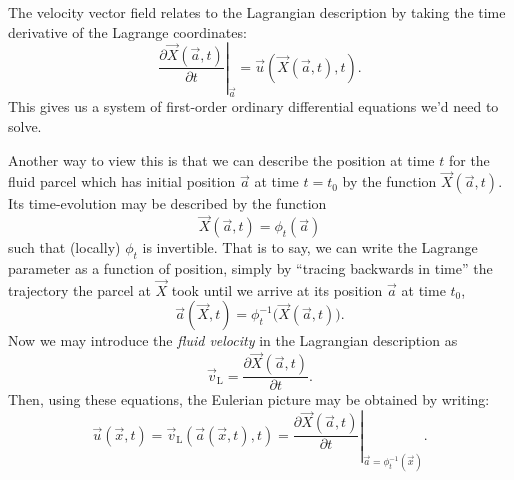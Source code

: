 \begin{node}\label{fluids:describing-0006}%
The velocity vector field relates to the Lagrangian description by
taking the time derivative of the Lagrange coordinates:
\begin{equation}
\left.\frac{\partial\vec{X}(\vec{a},t)}{\partial t}\right|_{\vec{a}}=\vec{u}(\vec{X}(\vec{a},t),t).
\end{equation}
This gives us a system of first-order ordinary differential equations
we'd need to solve.


Another way to view this is that we can describe the position at time
$t$ for the fluid parcel which has initial position $\vec{a}$ at time
$t=t_{0}$ by the function $\vec{X}(\vec{a},t)$. Its time-evolution may
be described by the function
\begin{equation}
\vec{X}(\vec{a},t)=\phi_{t}(\vec{a})
\end{equation}
such that (locally) $\phi_{t}$ is invertible. That is to say, we can
write the Lagrange parameter as a function of position, simply by
``tracing backwards in time'' the trajectory the parcel at $\vec{X}$
took until we arrive at its position $\vec{a}$ at time $t_{0}$,
\begin{equation}
\vec{a}(\vec{X},t) = \phi_{t}^{-1}\bigl(\vec{X}(\vec{a},t)\bigr).
\end{equation}
Now we may introduce the \emph{fluid velocity} in the Lagrangian
description as
\begin{equation}
\vec{v}_{\text{L}}=\frac{\partial\vec{X}(\vec{a},t)}{\partial t}.
\end{equation}
Then, using these equations, the Eulerian picture may be obtained by writing:
\begin{equation}
\vec{u}(\vec{x},t) = \vec{v}_{\text{L}}(\vec{a}(\vec{x},t),t)
=\left.\frac{\partial\vec{X}(\vec{a},t)}{\partial t}\right|_{\vec{a}=\phi_{t}^{-1}(\vec{x})}.
\end{equation}



\end{node}
